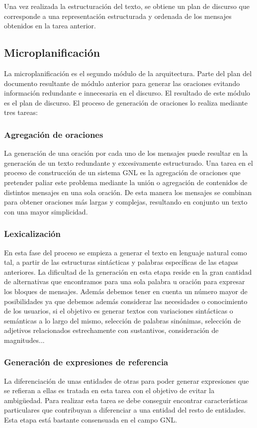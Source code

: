Una vez realizada la estructuración del texto, se obtiene un plan de discurso que corresponde a una representación estructurada y ordenada de los mensajes obtenidos en la tarea anterior.

\subsection{Microplanificación}
La microplanificación es el segundo módulo de la arquitectura. Parte del plan del documento resultante de módulo anterior para generar las oraciones evitando información redundante e innecesaria en el discurso. El resultado de este módulo es el plan de discurso. El proceso de generación de oraciones lo realiza mediante tres tareas:

\subsubsection{Agregación de oraciones}
La generación de una oración por cada uno de los mensajes puede resultar en la generación de un texto redundante y excesivamente estructurado. Una tarea en el proceso de construcción de un sistema GNL es la agregación de oraciones que pretender paliar este problema mediante la unión o agregación de contenidos de distintos mensajes en una sola oración. De esta manera los mensajes se combinan para obtener oraciones más largas y complejas, resultando en conjunto un texto con una mayor simplicidad.

\subsubsection{Lexicalización}
En esta fase del proceso se empieza a generar el texto en lenguaje natural como tal, a partir de las estructuras sintácticas y palabras específicas de las etapas anteriores. La dificultad de la generación en esta etapa reside en la gran cantidad de alternativas que encontramos para una sola palabra u oración para expresar los bloques de mensajes. Además debemos tener en cuenta un número mayor de posibilidades ya que debemos además considerar las necesidades o conocimiento de los usuarios, si el objetivo es generar textos con variaciones sintácticas o semánticas a lo largo del mismo, selección de palabras sinónimas, selección de adjetivos relacionados estrechamente con sustantivos, consideración de magnitudes... 


\subsubsection{Generación de expresiones de referencia}
La diferenciación de unas entidades de otras para poder generar expresiones que se refieran a ellas es tratada en esta tarea con el objetivo de evitar la ambigüedad. Para realizar esta tarea se debe conseguir encontrar características particulares que contribuyan a diferenciar a una entidad del resto de entidades. Esta etapa está bastante consensuada en el campo GNL. 

